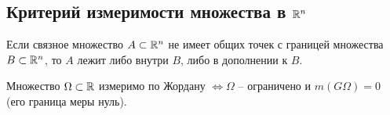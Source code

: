\subsection{Критерий измеримости множества в $\mathbb{R}^n$}

\begin{lemma}\label{lemma:8.1.3}
    Если связное множество $ A \subset \mathbb{R}^n $ не имеет общих точек с границей множества $ B \subset \mathbb{R}^n $, то $ A $ лежит либо внутри $ B $, либо в дополнении к $ B $.
\end{lemma}

\begin{theorem}
    Множество $ \Omega \subset \mathbb{R} $ измеримо по Жордану $ \iff \Omega $ -- ограничено и $ m(G\Omega) = 0 $ (его граница меры нуль).
\end{theorem}

